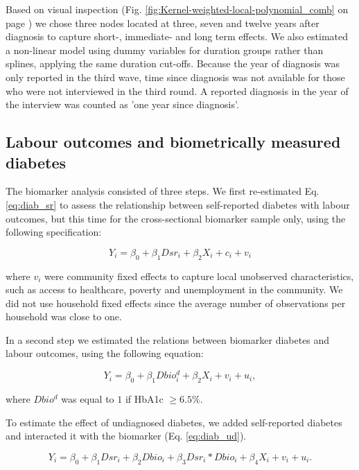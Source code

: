 \documentclass[12pt,english]{article}
\begin{document}
Based on visual inspection (Fig. \ref{fig:Kernel-weighted-local-polynomial_comb} on page \pageref{fig:Kernel-weighted-local-polynomial_comb}) we chose three nodes located at three, seven and twelve years after diagnosis to capture short-, immediate- and long term effects. We also estimated a non-linear model using dummy variables for duration groups rather than splines, applying the same duration cut-offs. Because the year of diagnosis was only reported in the third wave, time since diagnosis was not available for those who were not interviewed in the third round. A reported diagnosis in the year of the interview was counted as 'one year since diagnosis'.

\subsection{\label{sec:Biomarker Strategy}Labour outcomes and biometrically measured diabetes}

The biomarker analysis consisted of three steps. We first re-estimated Eq. \ref{eq:diab_sr} to assess the relationship between self-reported diabetes with labour outcomes, but this time for the cross-sectional biomarker sample only, using the following specification:

\begin{equation}
Y_{i}=\beta_{0}+\beta_{1}Dsr_{i}+\beta_{2}X_{i}+c_{i}+v_{i}\label{eq:diab_sr}
\end{equation}

where $v_{i}$ were community fixed effects to capture local unobserved characteristics, such as access to healthcare, poverty and unemployment in the community. We did not use household fixed effects since the average number of observations per household was close to one.

In a second step we estimated the relations between biomarker diabetes and labour outcomes, using the following equation:

\begin{equation}
Y_{i}=\beta_{0}+\beta_{1}Dbio^{d}_{i}+\beta_{2}X_{i}+v_{i}+u_{i}\label{eq:diab},
\end{equation}

where $Dbio^{d}$ was equal to $1$ if \ac{HbA1c} $\geq6.5\%$. 

To estimate the effect of undiagnosed diabetes, we added self-reported diabetes and interacted it with the biomarker (Eq. \ref{eq:diab_ud}).

\begin{equation}
Y_{i}=\beta_{0}+\beta_{1}Dsr_{i}+\beta_{2}Dbio_{i}+\beta_{3}Dsr_{i}*Dbio_{i}+\beta_{4}X_{i}+v_{i}+u_{i}.\label{eq:diab_ud}
\end{equation}
\end{document}
